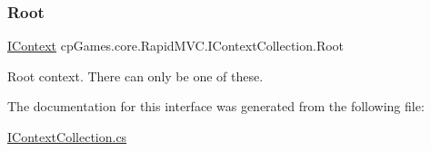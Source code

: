 \subsubsection{\texorpdfstring{Root}{Root}}
{\footnotesize\ttfamily \mbox{\hyperlink{interfacecp_games_1_1core_1_1_rapid_m_v_c_1_1_i_context}{I\+Context}} cp\+Games.\+core.\+Rapid\+M\+V\+C.\+I\+Context\+Collection.\+Root\hspace{0.3cm}{\ttfamily [get]}}



Root context. There can only be one of these. 



The documentation for this interface was generated from the following file\+:\begin{DoxyCompactItemize}
\item 
\mbox{\hyperlink{_i_context_collection_8cs}{I\+Context\+Collection.\+cs}}\end{DoxyCompactItemize}
